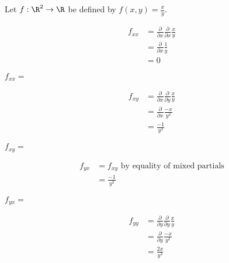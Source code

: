 \documentclass{ximera}
\begin{document}
 \begin{question}
 	Let $f:\R^2 \to \R$ be defined by $f(x,y) = \frac{x}{y}$.  
 	\begin{solution}
 		\begin{hint}
 					\begin{question}
 						
 						\begin{solution}
 						\begin{hint}
 							\begin{align*}
 								f_{xx} &= \frac{\partial}{\partial x} \frac{\partial }{\partial x} \frac{x}{y}\\
 									&= \frac{\partial}{\partial x} \frac{1}{y}\\
 									&= 0
 							\end{align*}
 						\end{hint}
 							$f_{xx}=$
 						\end{solution}
 						\begin{solution}
 						\begin{hint}
 							\begin{align*}
 								f_{xy} &= \frac{\partial}{\partial x} \frac{\partial }{\partial y} \frac{x}{y}\\
 									&= \frac{\partial}{\partial x} \frac{-x}{y^2}\\
 									&= \frac{-1}{y^2}
 							\end{align*}
 						\end{hint}
 							$f_{xy}=$\answer{$-1/y^2$}
 						\end{solution}
 						\begin{solution}
 						\begin{hint}
 							\begin{align*}
 								f_{yx} &= f_{xy} \text{ by equality of mixed partials}\\
 									&= \frac{-1}{y^2}
 							\end{align*}
 						\end{hint}
 							$f_{yx}=$
 						\end{solution}
 						\begin{solution}
 						\begin{hint}
 							\begin{align*}
 								f_{yy} &= \frac{\partial}{\partial y} \frac{\partial }{\partial y} \frac{x}{y}\\
 									&= \frac{\partial}{\partial y} \frac{-x}{y^2}\\
 									&= \frac{2x}{y^3}

\end{align*}
\end{hint}
\end{solution}
\end{question}
\end{hint}
\end{solution}
\end{question}
\end{document}

